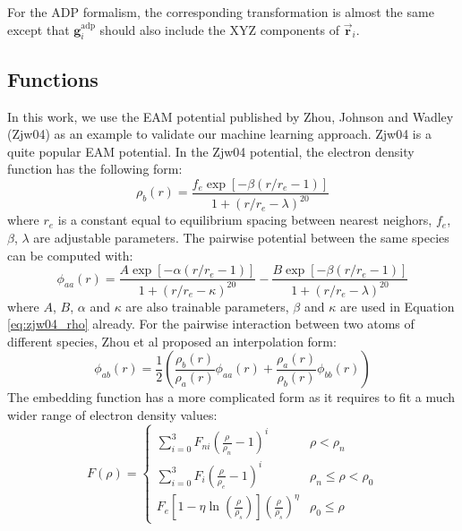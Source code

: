 \documentclass[prb,reprint]{revtex4-2}
\begin{document}
For the ADP formalism, the corresponding transformation is almost the same 
except that $\mathbf{g}_{i}^{\mathrm{adp}}$ should also include the XYZ 
components of $\vec{\mathbf{r}}_i$.

\subsection{Functions}
\label{sec:functions}

In this work, we use the EAM potential published by Zhou, Johnson and Wadley 
(Zjw04) as an example to validate our machine learning approach. Zjw04 is a 
quite popular EAM potential. In the Zjw04 potential, the electron density 
function has the following form:
\begin{equation}
\label{eq:zjw04_rho}
\rho_{b}(r) = \frac{
    f_{e} \exp\left[ -\beta\left( r/r_{e} - 1 \right) \right]
}{
    1 + \left(r/r_{e} - \lambda\right)^{20}
}
\end{equation}
where $r_e$ is a constant equal to equilibrium spacing between nearest neighors, 
$f_{e}$, $\beta$, $\lambda$ are adjustable parameters. The pairwise potential 
between the same species can be computed with:
\begin{equation}
\label{eq:zjw04_phi_aa}
\phi_{aa}(r) = 
\frac{A \exp\left[ -\alpha\left( r/r_{e} - 1 \right) \right]}
     {1 + \left(r / r_{e} - \kappa\right)^{20}} - 
\frac{B \exp\left[ -\beta\left( r/r_{e} - 1 \right) \right]}
     {1 + \left(r / r_{e} - \lambda\right)^{20}}
\end{equation}
where $A$, $B$, $\alpha$ and $\kappa$ are also trainable parameters, $\beta$ and 
$\kappa$ are used in Equation \ref{eq:zjw04_rho} already. For the pairwise 
interaction between two atoms of different species, Zhou et al proposed an 
interpolation form:
\begin{equation}
\label{eq:zjw04_phi_ab}
\phi_{ab}(r) = \frac{1}{2}\left(
    \frac{\rho_{b}(r)}{\rho_{a}(r)}\phi_{aa}(r) +
    \frac{\rho_{a}(r)}{\rho_{b}(r)}\phi_{bb}(r) 
\right)
\end{equation}
The embedding function has a more complicated form as it requires to fit a much 
wider range of electron density values:
\begin{equation}
\label{eq:zjw04_embed}
F(\rho) = \begin{cases}
    \sum_{i=0}^{3}{F_{ni}\left( \frac{\rho}{\rho_n} - 1 \right)^{i}} &
    \rho < \rho_{n} \\
    \sum_{i=0}^{3}{F_{i}\left( \frac{\rho}{\rho_e} - 1 \right)^{i}} &
    \rho_{n} \leq \rho < \rho_{0} \\
    F_{e}\left[ 
        1 - \eta\ln\left( \frac{\rho}{\rho_s}\right) 
    \right](\frac{\rho}{\rho_s})^{\eta} & \rho_{0} \leq \rho
\end{cases}
\end{equation}
\end{document}
